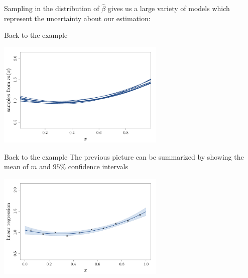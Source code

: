 \begin{frame}{}
Sampling in the distribution of $\hat{\beta}$ gives us a large variety of models which represent the uncertainty about our estimation:
\begin{exampleblock}{Back to the example}
\begin{center}
  \includegraphics[height=5cm]{1_stat_models/figures/R/linreg_4}
\end{center}
\end{exampleblock}
\end{frame}

\begin{frame}{}
\begin{exampleblock}{Back to the example}
The previous picture can be summarized by showing the mean of $m$ and $95\%$ confidence intervals
\begin{center}
  \includegraphics[height=5cm]{1_stat_models/figures/R/linreg_5}
\end{center}
\end{exampleblock}
\end{frame}


